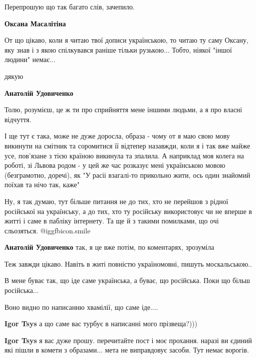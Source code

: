 \begin{itemize}
Перепрошую що так багато слів, зачепило.

\begin{itemize} %
\textbf{Оксана Масалітіна} 

От що цікаво, коли я читаю твої дописи українською, то читаю ту саму Оксану,
яку знав і з якою спілкувався раніше тільки рузькою... Тобто, ніякої "іншої
людини" немає...

дякую

\textbf{Анатолій Удовиченко} 

Толю, розумієш, це ж ти про сприйняття мене іншими людьми, а я про власні
відчуття.

І ще тут є така, може не дуже доросла, образа - чому от я маю свою мову
викинути на смітник та соромитися її відтепер назавжди, коли я і так вже майже
усе, пов'язане з тією країною викинула та зпалила. А наприклад моя колега на
роботі, зі Львова родом - у цей же час розказує мені українською мовою
(безграмотно, доречі), як "У расіі взагалі-то прикольно жити, ось один знайомий
поїхав та нічо так, каже"



Ну, я так думаю, тут більше питання не до тих, хто не перейшов з рідної
російської на українську, а до тих, хто ту російську використовує чи не вперше
в житті і саме в пабліку інтернету. Та ще й з такими помилками, що очі
сльозяться.  @igg{fbicon.smile} 

\textbf{Анатолій Удовиченко} так, я це вже потім, по коментарях, зрозуміла

\end{itemize} %

Теж завжди цікаво. Навіть в житі повністю україномовні, пишуть москальською..

В мене буває так, що іде саме українська, а буває, що російська. Поки що більш російська...

\begin{itemize} %
Воно видно по написанню хвамілії, що саме іде....

\textbf{Igor Tsys} а що саме вас турбує в написанні мого прізвеща?)))

\textbf{Igor Tsys} я вас дуже прошу. перечитайте пост і моє прохання. наразі ви єдиний які пішли в комети з образами... мета не виправдовує засоби. Тут немає ворогів.
\end{itemize} %


\end{itemize}
